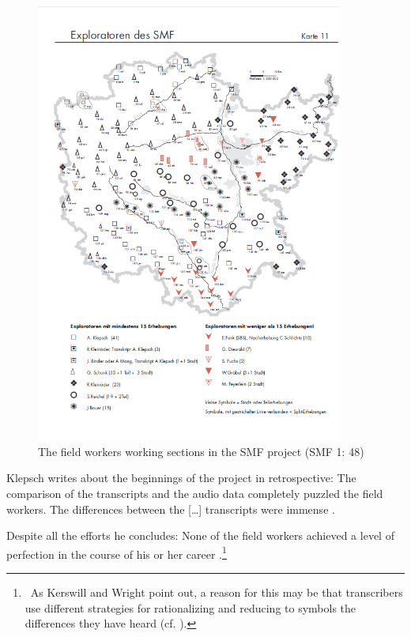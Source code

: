 \documentclass[output=paper]{LSP/langsci}
\begin{document}
\begin{figure}
\includegraphics[width=0.9\textwidth]{illustrations/mathus_fig5}
\caption{The field workers{\textquotesingle} working sections in the SMF project (SMF 1: 48)}
\label{fig:5}
\end{figure}

Klepsch writes about the beginnings of the project in retrospective: {\textquotedbl}The comparison of the transcripts and the audio data completely puzzled the field workers. The differences between the […] transcripts were immense{\textquotedbl} \citep[25]{klepsch_wie_2013}.

Despite all the efforts he concludes: {\textquotedbl}None of the field workers achieved a level of perfection in the course of his or her career{\textquotedbl} \citep[27]{klepsch_wie_2013}.\footnote{\ As Kerswill and Wright point out, a reason for this may be that transcribers use different strategies for {\textquotedbl}rationalizing and reducing to symbols the differences they have heard{\textquotedbl} (cf. \citealt[269]{kerswill_limits_1990}).}
\end{document}
